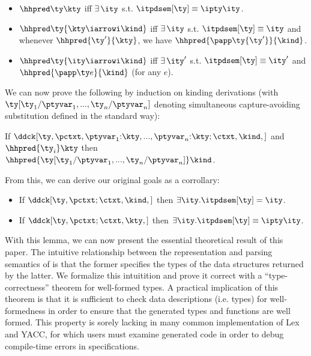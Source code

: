 \begin{definition}
\begin{itemize}
\item $\hhpred \ty \kty$ iff $\exists\,\ity$ s.t. $\itpdsem[\ty] \equiv
  {\ipty \ity}$.
\item $\hhpred \ty {\kty \iarrowi \kind}$ iff $\exists\,\ity$
  s.t. $\itpdsem[\ty] \equiv \ity$ and whenever $\hhpred
  {\ty'}{\kty}$, we have $\hhpred {\papp \ty {\ty'}}{\kind}$.
\item $\hhpred \ty {\ity \iarrowi \kind}$ iff $\exists\,\ity'$
  s.t. $\itpdsem[\ty] \equiv \ity'$ and $\hhpred{\papp \ty e}{\kind}$ (for any $e$).
\end{itemize}
\end{definition}

We can now prove the following by induction on kinding derivations
(with $\ty[\ty_1/\ptyvar_1,...,\ty_n/\ptyvar_n]$ denoting simultaneous
capture-avoiding substitution defined in the standard way):
\begin{lemma}
   If
   $\ddck[\ty,{\pctxt,\ptyvar_1{:}\kty,...,\ptyvar_n{:}\kty;\ctxt},\kind,{}]$ and $\hhpred {\ty_i} \kty$ then $\hhpred {\ty[\ty_1/\ptyvar_1,...,\ty_n/\ptyvar_n]} \kind$.
\end{lemma}

From this, we can derive our original goals as a corrollary:
\begin{lemma}
  \begin{itemize}
  \item If $\ddck[\ty,\pctxt;\ctxt,\kind,{}]$ then $\exists
     \ity.\itpdsem[\ty] = \ity$.
   \item If $\ddck[\ty,\pctxt;\ctxt,\kty,{}]$ then $\exists
     \ity.\itpdsem[\ty] \equiv \ipty \ity$.
  \end{itemize}
\end{lemma}

With this lemma, we can now present the essential theoretical result
of this paper. The intuitive relationship between the representation
and parsing semantics of \ddc{} is that the former specifies the types
of the data structures returned by the latter. We formalize this
intuitition and prove it correct with a ``type-correctness'' theorem
for well-formed types. A practical implication of this theorem is that
it is sufficient to check data descriptions (i.e. \ddc{} types) for
well-formedness in order to ensure that the generated types and
functions are well formed. This property is sorely lacking in many
common implementation of Lex and YACC, for which users must examine
generated code in order to debug compile-time errors in
specifications.


